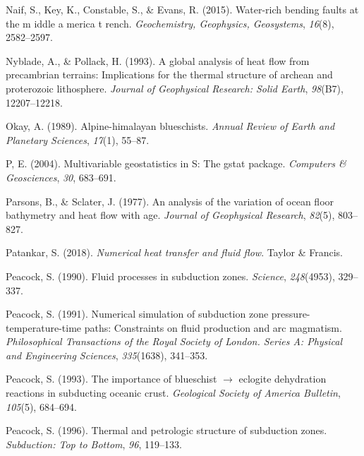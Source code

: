 \begin{CSLReferences}{1}{1}
\leavevmode{}%
Naif, S., Key, K., Constable, S., \& Evans, R. (2015). Water-rich bending faults at the m iddle a merica t rench. \emph{Geochemistry, Geophysics, Geosystems}, \emph{16}(8), 2582--2597.

\leavevmode{}%
Nyblade, A., \& Pollack, H. (1993). A global analysis of heat flow from precambrian terrains: Implications for the thermal structure of archean and proterozoic lithosphere. \emph{Journal of Geophysical Research: Solid Earth}, \emph{98}(B7), 12207--12218.

\leavevmode{}%
Okay, A. (1989). Alpine-himalayan blueschists. \emph{Annual Review of Earth and Planetary Sciences}, \emph{17}(1), 55--87.

\leavevmode{}%
P, E. (2004). Multivariable geostatistics in {S}: The gstat package. \emph{Computers \& Geosciences}, \emph{30}, 683--691.

\leavevmode{}%
Parsons, B., \& Sclater, J. (1977). An analysis of the variation of ocean floor bathymetry and heat flow with age. \emph{Journal of Geophysical Research}, \emph{82}(5), 803--827.

\leavevmode{}%
Patankar, S. (2018). \emph{Numerical heat transfer and fluid flow}. Taylor \& Francis.

\leavevmode{}%
Peacock, S. (1990). Fluid processes in subduction zones. \emph{Science}, \emph{248}(4953), 329--337.

\leavevmode{}%
Peacock, S. (1991). Numerical simulation of subduction zone pressure-temperature-time paths: Constraints on fluid production and arc magmatism. \emph{Philosophical Transactions of the Royal Society of London. Series A: Physical and Engineering Sciences}, \emph{335}(1638), 341--353.

\leavevmode{}%
Peacock, S. (1993). The importance of blueschist \(\rightarrow\) eclogite dehydration reactions in subducting oceanic crust. \emph{Geological Society of America Bulletin}, \emph{105}(5), 684--694.

\leavevmode{}%
Peacock, S. (1996). Thermal and petrologic structure of subduction zones. \emph{Subduction: Top to Bottom}, \emph{96}, 119--133.


\end{CSLReferences}
